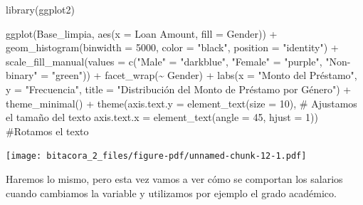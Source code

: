 \documentclass[
  letterpaper,
  DIV=11,
  numbers=noendperiod]{scrreprt}
\newenvironment{Shaded}{\begin{snugshade}}{\end{snugshade}}
\newcommand{\AttributeTok}[1]{\textcolor[rgb]{0.40,0.45,0.13}{#1}}
\newcommand{\CommentTok}[1]{\textcolor[rgb]{0.37,0.37,0.37}{#1}}
\newcommand{\DecValTok}[1]{\textcolor[rgb]{0.68,0.00,0.00}{#1}}
\newcommand{\FunctionTok}[1]{\textcolor[rgb]{0.28,0.35,0.67}{#1}}
\newcommand{\NormalTok}[1]{\textcolor[rgb]{0.00,0.23,0.31}{#1}}
\newcommand{\OtherTok}[1]{\textcolor[rgb]{0.00,0.23,0.31}{#1}}
\newcommand{\SpecialCharTok}[1]{\textcolor[rgb]{0.37,0.37,0.37}{#1}}
\newcommand{\StringTok}[1]{\textcolor[rgb]{0.13,0.47,0.30}{#1}}
\begin{document}
\begin{Shaded}
\begin{Highlighting}[]
\FunctionTok{library}\NormalTok{(ggplot2)}

\FunctionTok{ggplot}\NormalTok{(Base\_limpia, }\FunctionTok{aes}\NormalTok{(}\AttributeTok{x =} \StringTok{\textasciigrave{}}\AttributeTok{Loan Amount}\StringTok{\textasciigrave{}}\NormalTok{, }\AttributeTok{fill =}\NormalTok{ Gender)) }\SpecialCharTok{+}  
  \FunctionTok{geom\_histogram}\NormalTok{(}\AttributeTok{binwidth =} \DecValTok{5000}\NormalTok{, }\AttributeTok{color =} \StringTok{"black"}\NormalTok{, }\AttributeTok{position =} \StringTok{"identity"}\NormalTok{) }\SpecialCharTok{+}  
  \FunctionTok{scale\_fill\_manual}\NormalTok{(}\AttributeTok{values =} \FunctionTok{c}\NormalTok{(}\StringTok{"Male"} \OtherTok{=} \StringTok{"darkblue"}\NormalTok{, }\StringTok{"Female"} \OtherTok{=} \StringTok{"purple"}\NormalTok{, }\StringTok{"Non{-}binary"} \OtherTok{=} \StringTok{"green"}\NormalTok{)) }\SpecialCharTok{+}  
  \FunctionTok{facet\_wrap}\NormalTok{(}\SpecialCharTok{\textasciitilde{}}\NormalTok{ Gender) }\SpecialCharTok{+}  
  \FunctionTok{labs}\NormalTok{(}\AttributeTok{x =} \StringTok{"Monto del Préstamo"}\NormalTok{, }\AttributeTok{y =} \StringTok{"Frecuencia"}\NormalTok{, }\AttributeTok{title =} \StringTok{"Distribución del Monto de Préstamo por Género"}\NormalTok{) }\SpecialCharTok{+} 
  \FunctionTok{theme\_minimal}\NormalTok{() }\SpecialCharTok{+}
  \FunctionTok{theme}\NormalTok{(}\AttributeTok{axis.text.y =} \FunctionTok{element\_text}\NormalTok{(}\AttributeTok{size =} \DecValTok{10}\NormalTok{), }\CommentTok{\# Ajustamos el tamaño del texto}
        \AttributeTok{axis.text.x =} \FunctionTok{element\_text}\NormalTok{(}\AttributeTok{angle =} \DecValTok{45}\NormalTok{, }\AttributeTok{hjust =} \DecValTok{1}\NormalTok{))  }\CommentTok{\#Rotamos el texto}
\end{Highlighting}
\end{Shaded}

\texttt{[image: bitacora\_2\_files/figure-pdf/unnamed-chunk-12-1.pdf]}

Haremos lo mismo, pero esta vez vamos a ver cómo se comportan los
salarios cuando cambiamos la variable y utilizamos por ejemplo el grado
académico.
\end{document}
